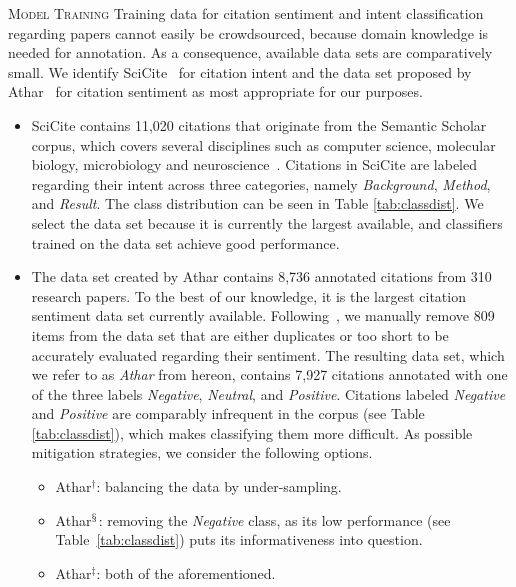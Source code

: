 \textsc{Model Training}
Training data for citation sentiment and intent classification regarding papers cannot easily be crowdsourced, because domain knowledge is needed for annotation. As a consequence, available data sets are comparatively small. We identify SciCite~\cite{Cohan2019} for citation intent and the data set proposed by Athar~\cite{Athar2011} for citation sentiment as most appropriate for our purposes.

\begin{itemize}
\item SciCite contains 11,020 citations that originate from the Semantic Scholar corpus, which covers several disciplines such as computer science, molecular biology, microbiology and neuroscience~\cite{Ammar2018}. Citations in SciCite are labeled regarding their intent across three categories, namely \textit{Background}, \textit{Method}, and \textit{Result}. The class distribution can be seen in Table \ref{tab:classdist}. We select the data set because it is currently the largest available, and classifiers trained on the data set achieve good performance.

\item The data set created by Athar contains 8,736 annotated citations from 310 research papers. To the best of our knowledge, it is the largest citation sentiment data set currently available. Following~\cite{Mercier2021}, we manually remove 809 items from the data set that are either duplicates or too short to be accurately evaluated regarding their sentiment. The resulting data set, which we refer to as \textit{Athar} from hereon, contains 7,927 citations annotated with one of the three labels \textit{Negative}, \textit{Neutral}, and \textit{Positive}. Citations labeled \textit{Negative} and \textit{Positive} are comparably infrequent in the corpus (see Table \ref{tab:classdist}), which makes classifying them more difficult. As possible mitigation strategies, we consider the following options.
    \begin{itemize}
    \item Athar$^{\dagger}$: balancing the data by under-sampling.
    \item Athar$^{\mathsection}$: removing the \textit{Negative} class, as its low performance (see Table~\ref{tab:classdist}) puts its informativeness into question.
    \item Athar$^{\ddagger}$: both of the aforementioned.
    \end{itemize}
\end{itemize}

